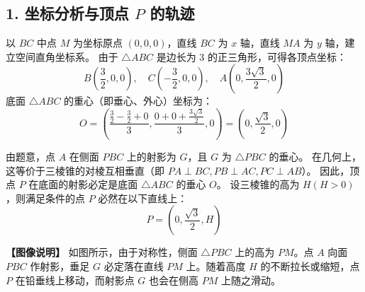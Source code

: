 \documentclass[11pt,a4paper]{ctexart}
\begin{document}
\subsection*{1. 坐标分析与顶点 $P$ 的轨迹}
以 $BC$ 中点 $M$ 为坐标原点 $(0,0,0)$，直线 $BC$ 为 $x$ 轴，直线 $MA$ 为 $y$ 轴，建立空间直角坐标系。
由于 $\triangle ABC$ 是边长为 3 的正三角形，可得各顶点坐标：
$$B\left(\frac{3}{2}, 0, 0\right), \quad C\left(-\frac{3}{2}, 0, 0\right), \quad A\left(0, \frac{3\sqrt{3}}{2}, 0\right)$$
底面 $\triangle ABC$ 的重心（即垂心、外心）坐标为：
$$O = \left( \frac{\frac{3}{2} - \frac{3}{2} + 0}{3}, \frac{0 + 0 + \frac{3\sqrt{3}}{2}}{3}, 0 \right) = \left(0, \frac{\sqrt{3}}{2}, 0\right)$$

由题意，点 $A$ 在侧面 $PBC$ 上的射影为 $G$，且 $G$ 为 $\triangle PBC$ 的垂心。
在几何上，这等价于三棱锥的对棱互相垂直（即 $PA \perp BC, PB \perp AC, PC \perp AB$）。
因此，顶点 $P$ 在底面的射影必定是底面 $\triangle ABC$ 的垂心 $O$。
设三棱锥的高为 $H (H > 0)$，则满足条件的点 $P$ 必然在以下直线上：
$$P = \left(0, \frac{\sqrt{3}}{2}, H\right)$$

\vspace{0.2cm}
\noindent \textbf{【图像说明】} 如图所示，由于对称性，侧面 $\triangle PBC$ 上的高为 $PM$。点 $A$ 向面 $PBC$ 作射影，垂足 $G$ 必定落在直线 $PM$ 上。随着高度 $H$ 的不断拉长或缩短，点 $P$ 在铅垂线上移动，而射影点 $G$ 也会在侧高 $PM$ 上随之滑动。
\end{document}
